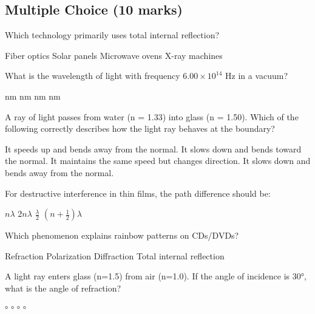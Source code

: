 \documentclass[addpoints]{exam}
\begin{document}
\newpage

\begin{questions}


\section*{Multiple Choice (10 marks)}
\vspace{5mm}

\question[1] Which technology primarily uses total internal reflection?
\begin{choices}
    \correctchoice Fiber optics
    \choice Solar panels
    \choice Microwave ovens
    \choice X-ray machines
\end{choices}

\question[1] What is the wavelength of light with frequency \(6.00 \times 10^{14}\) Hz in a vacuum?
\begin{choices}
     nm
     nm
     nm
     nm
\end{choices}

\question[1] A ray of light passes from water (n = 1.33) into glass (n = 1.50). Which of the following correctly describes how the light ray behaves at the boundary?
\begin{choices}
    \choice It speeds up and bends away from the normal.
    \correctchoice It slows down and bends toward the normal.
    \choice It maintains the same speed but changes direction.
    \choice It slows down and bends away from the normal.
\end{choices}

\question[1] For destructive interference in thin films, the path difference should be:
\begin{choices}
    \choice \(n\lambda\)
    \choice \(2n\lambda\)
    \choice \(\frac{\lambda}{2}\)
    \correctchoice \((n + \frac{1}{2})\lambda\)
\end{choices}

\question[1] Which phenomenon explains rainbow patterns on CDs/DVDs?
\begin{choices}
    \choice Refraction
    \choice Polarization
    \correctchoice Diffraction
    \choice Total internal reflection
\end{choices}

\question[1] A light ray enters glass (n=1.5) from air (n=1.0). If the angle of incidence is 30°, what is the angle of refraction?
\begin{choices}
    °
    °
    °
    °
\end{choices}


\end{questions}
\end{document}
